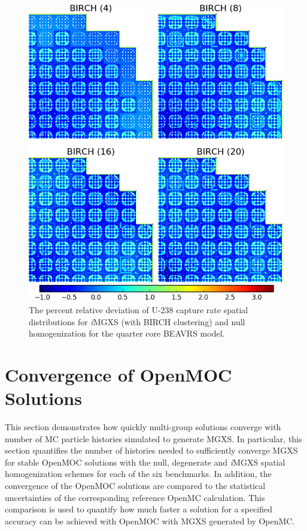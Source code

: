 \begin{figure}[h!]
\centering
\includegraphics[width=0.9\linewidth]{figures/results/compare/full-core/compare-capt-birch}
\vspace{2mm}
\caption[U-238 capture rate \textit{i}MGXS-to-null relative deviations]{The percent relative deviation of U-238 capture rate spatial distributions for \textit{i}\ac{MGXS} (with BIRCH clustering) and null homogenization for the quarter core BEAVRS model.}
\label{fig:chap11-full-core-capt-rates-birch-comp}
\end{figure}

\clearpage


\section{Convergence of OpenMOC Solutions}
\label{sec:chap11-converge}

This section demonstrates how quickly multi-group solutions converge with number of \ac{MC} particle histories simulated to generate \ac{MGXS}. In particular, this section quantifies the number of histories needed to sufficiently converge \ac{MGXS} for stable OpenMOC solutions with the null, degenerate and \textit{i}\ac{MGXS} spatial homogenization schemes for each of the six benchmarks. In addition, the convergence of the OpenMOC solutions are compared to the statistical uncertainties of the corresponding reference OpenMC calculation. This comparison is used to quantify how much faster a solution for a specified accuracy can be achieved with OpenMOC with \ac{MGXS} generated by OpenMC.

